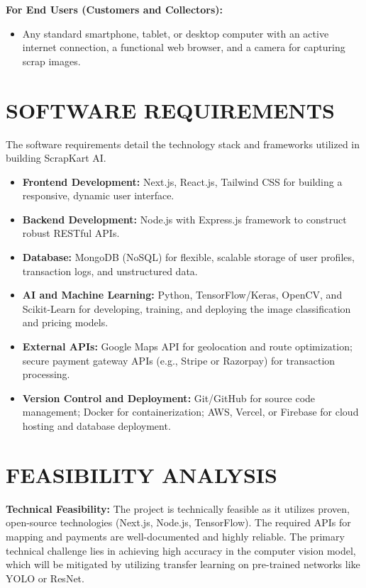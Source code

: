 \textbf{For End Users (Customers and Collectors):}
\begin{itemize}
    \item Any standard smartphone, tablet, or desktop computer with an active internet connection, a functional web browser, and a camera for capturing scrap images.
\end{itemize}

\section{SOFTWARE REQUIREMENTS}
The software requirements detail the technology stack and frameworks utilized in building ScrapKart AI.
\begin{itemize}
    \item \textbf{Frontend Development:} Next.js, React.js, Tailwind CSS for building a responsive, dynamic user interface.
    \item \textbf{Backend Development:} Node.js with Express.js framework to construct robust RESTful APIs.
    \item \textbf{Database:} MongoDB (NoSQL) for flexible, scalable storage of user profiles, transaction logs, and unstructured data.
    \item \textbf{AI and Machine Learning:} Python, TensorFlow/Keras, OpenCV, and Scikit-Learn for developing, training, and deploying the image classification and pricing models.
    \item \textbf{External APIs:} Google Maps API for geolocation and route optimization; secure payment gateway APIs (e.g., Stripe or Razorpay) for transaction processing.
    \item \textbf{Version Control and Deployment:} Git/GitHub for source code management; Docker for containerization; AWS, Vercel, or Firebase for cloud hosting and database deployment.
\end{itemize}

\section{FEASIBILITY ANALYSIS}
\textbf{Technical Feasibility:} The project is technically feasible as it utilizes proven, open-source technologies (Next.js, Node.js, TensorFlow). The required APIs for mapping and payments are well-documented and highly reliable. The primary technical challenge lies in achieving high accuracy in the computer vision model, which will be mitigated by utilizing transfer learning on pre-trained networks like YOLO or ResNet.

